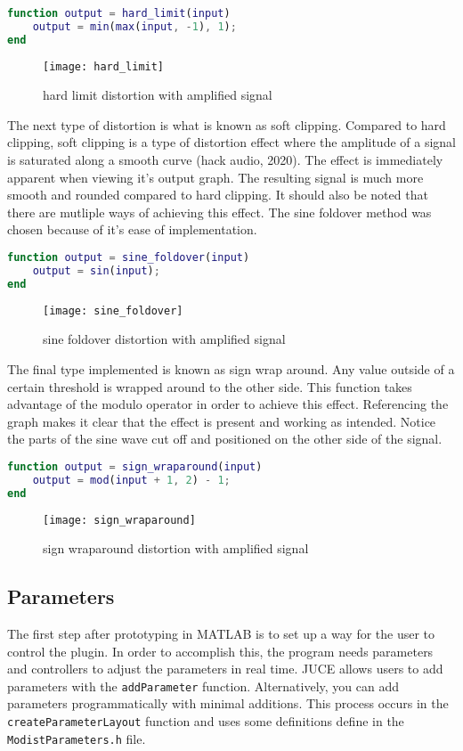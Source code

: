 \documentclass{article}
\begin{document}
\begin{lstlisting}[language=MATLAB]
function output = hard_limit(input)
    output = min(max(input, -1), 1);
end
\end{lstlisting}

\begin{figure}[ht]
\centerline{\texttt{[image: hard\_limit]}}
\caption{hard limit distortion with amplified signal}
\end{figure}
\pagebreak
The next type of distortion is what is known as soft clipping. Compared to hard clipping,
soft clipping is a type of distortion effect where the amplitude of a signal is saturated along a smooth curve (hack audio, 2020).
The effect is immediately apparent when viewing it's output graph. The resulting
signal is much more smooth and rounded compared to hard clipping. It should also be noted that there
are mutliple ways of achieving this effect. The sine foldover method was chosen because of it's ease
of implementation.

\begin{lstlisting}[language=MATLAB]
function output = sine_foldover(input)
    output = sin(input);
end
\end{lstlisting}

\begin{figure}[ht]
\centerline{\texttt{[image: sine\_foldover]}}
\caption{sine foldover distortion with amplified signal}
\end{figure}
\pagebreak
The final type implemented is known as sign wrap around. Any value outside of a certain
threshold is wrapped around to the other side. This function takes advantage of the modulo operator
in order to achieve this effect. Referencing the graph makes it clear that the effect is present and
working as intended. Notice the parts of the sine wave cut off and positioned on the other side of the
signal.
\begin{lstlisting}[language=MATLAB]
function output = sign_wraparound(input)
    output = mod(input + 1, 2) - 1;
end
\end{lstlisting}
\begin{figure}[ht]
\centerline{\texttt{[image: sign\_wraparound]}}
\caption{sign wraparound distortion with amplified signal}
\end{figure}

\pagebreak
\subsection{Parameters}
The first step after prototyping in MATLAB is to set up a way for the user to control
the plugin. In order to accomplish this, the program needs parameters and controllers
to adjust the parameters in real time. JUCE allows users to add parameters with the
\lstinline{addParameter} function. Alternatively, you can add parameters programmatically
with minimal additions. This process occurs in the \lstinline{createParameterLayout} function
and uses some definitions define in the \lstinline{ModistParameters.h} file.
\end{document}
